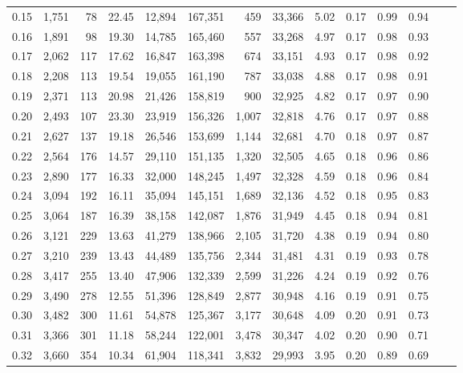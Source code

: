 \begin{tabular}{rrrrrrrrrrrrrr}
0.15 &  1,751 &   78 &   22.45 &   12,894 &  167,351 &     459 &  33,366 &  5.02 &  0.17 &  0.99 &      0.94 \\
0.16 &  1,891 &   98 &   19.30 &   14,785 &  165,460 &     557 &  33,268 &  4.97 &  0.17 &  0.98 &      0.93 \\
0.17 &  2,062 &  117 &   17.62 &   16,847 &  163,398 &     674 &  33,151 &  4.93 &  0.17 &  0.98 &      0.92 \\
0.18 &  2,208 &  113 &   19.54 &   19,055 &  161,190 &     787 &  33,038 &  4.88 &  0.17 &  0.98 &      0.91 \\
0.19 &  2,371 &  113 &   20.98 &   21,426 &  158,819 &     900 &  32,925 &  4.82 &  0.17 &  0.97 &      0.90 \\
0.20 &  2,493 &  107 &   23.30 &   23,919 &  156,326 &   1,007 &  32,818 &  4.76 &  0.17 &  0.97 &      0.88 \\
0.21 &  2,627 &  137 &   19.18 &   26,546 &  153,699 &   1,144 &  32,681 &  4.70 &  0.18 &  0.97 &      0.87 \\
0.22 &  2,564 &  176 &   14.57 &   29,110 &  151,135 &   1,320 &  32,505 &  4.65 &  0.18 &  0.96 &      0.86 \\
0.23 &  2,890 &  177 &   16.33 &   32,000 &  148,245 &   1,497 &  32,328 &  4.59 &  0.18 &  0.96 &      0.84 \\
0.24 &  3,094 &  192 &   16.11 &   35,094 &  145,151 &   1,689 &  32,136 &  4.52 &  0.18 &  0.95 &      0.83 \\
0.25 &  3,064 &  187 &   16.39 &   38,158 &  142,087 &   1,876 &  31,949 &  4.45 &  0.18 &  0.94 &      0.81 \\
0.26 &  3,121 &  229 &   13.63 &   41,279 &  138,966 &   2,105 &  31,720 &  4.38 &  0.19 &  0.94 &      0.80 \\
0.27 &  3,210 &  239 &   13.43 &   44,489 &  135,756 &   2,344 &  31,481 &  4.31 &  0.19 &  0.93 &      0.78 \\
0.28 &  3,417 &  255 &   13.40 &   47,906 &  132,339 &   2,599 &  31,226 &  4.24 &  0.19 &  0.92 &      0.76 \\
0.29 &  3,490 &  278 &   12.55 &   51,396 &  128,849 &   2,877 &  30,948 &  4.16 &  0.19 &  0.91 &      0.75 \\
0.30 &  3,482 &  300 &   11.61 &   54,878 &  125,367 &   3,177 &  30,648 &  4.09 &  0.20 &  0.91 &      0.73 \\
0.31 &  3,366 &  301 &   11.18 &   58,244 &  122,001 &   3,478 &  30,347 &  4.02 &  0.20 &  0.90 &      0.71 \\
0.32 &  3,660 &  354 &   10.34 &   61,904 &  118,341 &   3,832 &  29,993 &  3.95 &  0.20 &  0.89 &      0.69 \\

\end{tabular}
